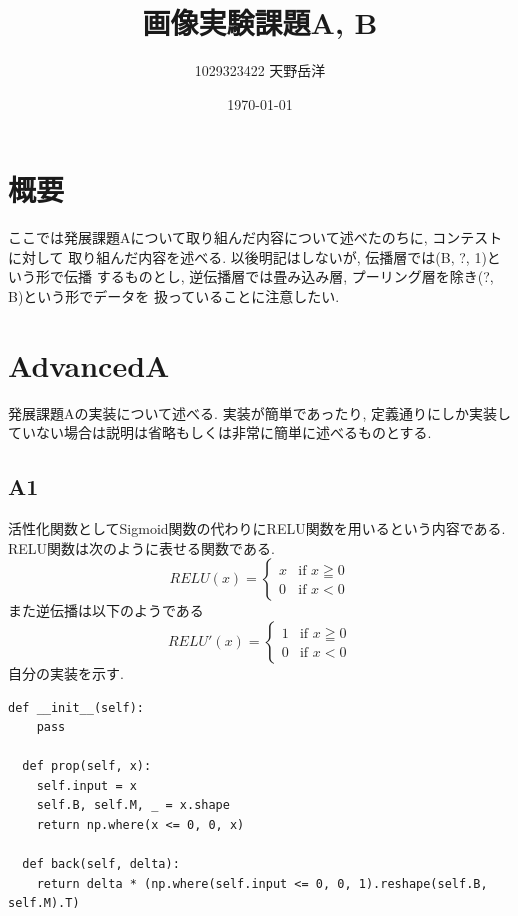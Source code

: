 \documentclass[a4paper,11pt]{jsarticle}
\begin{document}
\title{画像実験課題A, B}
\author{1029323422 天野岳洋}
\date{\today}
\maketitle
\clearpage

\section{概要}
ここでは発展課題Aについて取り組んだ内容について述べたのちに, コンテストに対して
取り組んだ内容を述べる. 以後明記はしないが, 伝播層では(B, ?, 1)という形で伝播
するものとし, 逆伝播層では畳み込み層, プーリング層を除き(?, B)という形でデータを
扱っていることに注意したい.
\section{AdvancedA}
発展課題Aの実装について述べる. 実装が簡単であったり,
定義通りにしか実装していない場合は説明は省略もしくは非常に簡単に述べるものとする.
\subsection{A1}
活性化関数としてSigmoid関数の代わりにRELU関数を用いるという内容である.
RELU関数は次のように表せる関数である.
\begin{equation}
  RELU(x)=
  \begin{cases}
    x & \text{if $x \geqq 0$} \\
    0 & \text{if $x < 0$}
  \end{cases}
\end{equation}
また逆伝播は以下のようである
\begin{equation}
  RELU'(x) =
  \begin{cases}
    1 & \text{if $x \geqq 0$} \\
    0 & \text{if $x < 0$}
  \end{cases}
\end{equation}
自分の実装を示す.
\begin{lstlisting}[caption=RELU]
  def __init__(self):
    pass

  def prop(self, x):
    self.input = x
    self.B, self.M, _ = x.shape
    return np.where(x <= 0, 0, x)
    
  def back(self, delta):
    return delta * (np.where(self.input <= 0, 0, 1).reshape(self.B, self.M).T)
\end{lstlisting}
\end{document}

